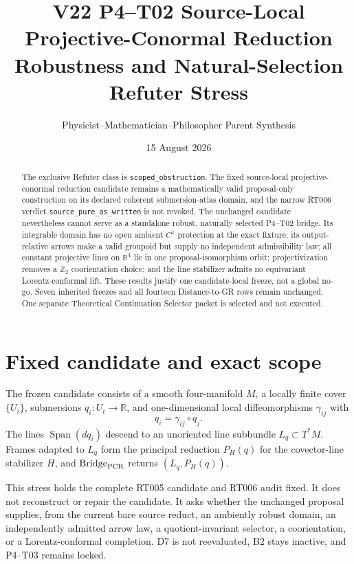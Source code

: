 \documentclass[11pt]{article}
\title{V22 P4--T02 Source-Local Projective-Conormal Reduction\\
Robustness and Natural-Selection Refuter Stress}
\author{Physicist--Mathematician--Philosopher Parent Synthesis}
\date{15 August 2026}
\newcommand{\Span}{\operatorname{Span}}
\begin{document}
\maketitle

\begin{abstract}
The exclusive Refuter class is \texttt{scoped\_obstruction}.  The fixed
source-local projective-conormal reduction candidate remains a mathematically
valid proposal-only construction on its declared coherent submersion-atlas
domain, and the narrow RT006 verdict \texttt{source\_pure\_as\_written} is not
revoked.  The unchanged candidate nevertheless cannot serve as a standalone
robust, naturally selected P4--T02 bridge.  Its integrable domain has no open
ambient $C^1$ protection at the exact fixture; its output-relative arrows
make a valid groupoid but supply no independent admissibility law; all
constant projective lines on $\mathbb R^4$ lie in one proposal-isomorphism
orbit; projectivization removes a $\mathbb Z_2$ coorientation choice; and the
line stabilizer admits no equivariant Lorentz-conformal lift.  These results
justify one candidate-local freeze, not a global no-go.  Seven inherited
freezes and all fourteen Distance-to-GR rows remain unchanged.  One separate
Theoretical Continuation Selector packet is selected and not executed.
\end{abstract}

\section{Fixed candidate and exact scope}

The frozen candidate consists of a smooth four-manifold $M$, a locally finite
cover $\{U_i\}$, submersions $q_i:U_i\to\mathbb R$, and one-dimensional local
diffeomorphisms $\gamma_{ij}$ with
\[
 q_i=\gamma_{ij}\circ q_j.
\]
The lines $\Span(dq_i)$ descend to an unoriented line subbundle
$L_q\subset T^*M$.  Frames adapted to $L_q$ form the principal reduction
$P_H(q)$ for the covector-line stabilizer $H$, and
$\mathrm{Bridge}_{\rm PCR}$ returns $(L_q,P_H(q))$.

This stress holds the complete RT005 candidate and RT006 audit fixed.  It does
not reconstruct or repair the candidate.  It asks whether the unchanged
proposal supplies, from the current bare source reduct, an ambiently robust
domain, an independently admitted arrow law, a quotient-invariant selector,
a coorientation, or a Lorentz-conformal completion.  D7 is not reevaluated,
B2 stays inactive, and P4--T03 remains locked.
\end{document}
